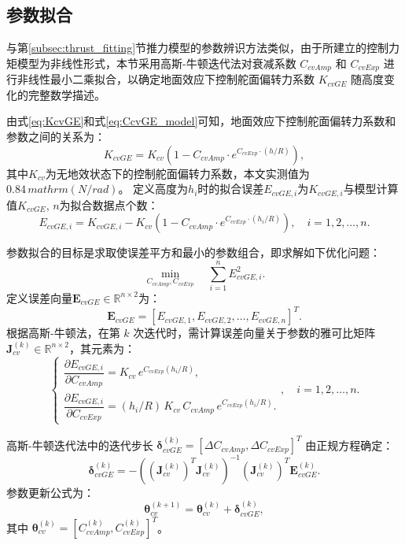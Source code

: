 \subsection{参数拟合}
\label{subsec:torque_fitting}
与第\ref{subsec:thrust_fitting}节推力模型的参数辨识方法类似，由于所建立的控制力矩模型为非线性形式，本节采用高斯-牛顿迭代法对衰减系数 $C_{cvAmp}$ 和 $C_{cvExp}$ 进行非线性最小二乘拟合，以确定地面效应下控制舵面偏转力系数 $K_{cvGE}$ 随高度变化的完整数学描述。

由式\eqref{eq:KcvGE}和式\eqref{eq:CcvGE_model}可知，地面效应下控制舵面偏转力系数和参数之间的关系为：
\begin{equation}
    K_{cvGE} = K_{cv}(1 - C_{cvAmp} \cdot e^{C_{cvExp} \cdot (h/R)}),
    \label{eq:KcvGE_model}
\end{equation}
其中$K_{cv}$为无地效状态下的控制舵面偏转力系数，本文实测值为$0.84\,mathrm{(N/rad)}$。
定义高度为$h_i$时的拟合误差$E_{cvGE,i}$为$K_{cvGE,i}$与模型计算值$K_{cvGE}$, $n$为拟合数据点个数：
\begin{equation}
    E_{cvGE,i} = K_{cvGE,i} - K_{cv}(1 - C_{cvAmp} \cdot e^{C_{cvExp} \cdot (h_i/R)}), \quad i = 1,2,\dots,n.
\end{equation}

参数拟合的目标是求取使误差平方和最小的参数组合，即求解如下优化问题：
\begin{equation}
    \min_{C_{cvAmp}, C_{cvExp}} \quad \sum_{i=1}^{n} E_{cvGE,i}^2.
\end{equation}
定义误差向量$\bm{E}_{cvGE} \in \mathbb{R}^{n \times 2}$为：
\begin{equation}
    \bm{E}_{cvGE} = [E_{cvGE,1}, E_{cvGE,2}, \dots, E_{cvGE,n}]^{T}.
\end{equation}
根据高斯-牛顿法，在第 $k$ 次迭代时，需计算误差向量关于参数的雅可比矩阵 $\bm{J}_{cv}^{(k)} \in \mathbb{R}^{n \times 2}$，其元素为：
\begin{equation}
    \begin{cases}
        \dfrac{\partial E_{cvGE,i}}{\partial C_{cvAmp}} = K_{cv} \, e^{C_{cvExp} (h_i/R)},\\[8pt]
        \dfrac{\partial E_{cvGE,i}}{\partial C_{cvExp}} = (h_i/R)\, K_{cv}\, C_{cvAmp} \, e^{C_{cvExp} (h_i/R)}.
    \end{cases}
    ,\quad i = 1,2,\dots,n.
\end{equation}

高斯-牛顿迭代法中的迭代步长 $\bm{\delta}_{cvGE}^{(k)} = [\Delta C_{cvAmp}, \Delta C_{cvExp}]^{T}$ 由正规方程确定：
\begin{equation}
    \bm{\delta}_{cvGE}^{(k)} = -\left( (\bm{J}_{cv}^{(k)})^{T} \bm{J}_{cv}^{(k)} \right)^{-1} (\bm{J}_{cv}^{(k)})^{T} \bm{E}_{cvGE}^{(k)}.
\end{equation}
参数更新公式为：
\begin{equation}
    \bm{\theta}_{cv}^{(k+1)} = \bm{\theta}_{cv}^{(k)} + \bm{\delta}_{cvGE}^{(k)},
\end{equation}
其中 $\bm{\theta}_{cv}^{(k)} = [C_{cvAmp}^{(k)}, C_{cvExp}^{(k)}]^{T}$。


